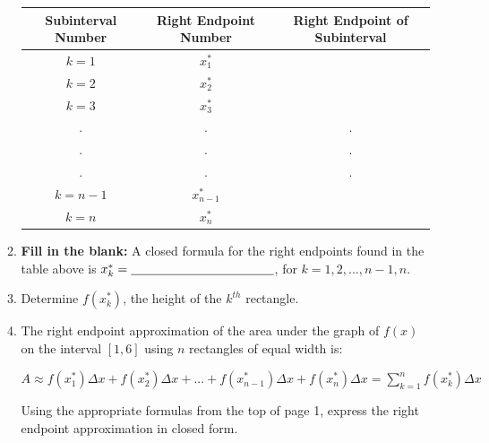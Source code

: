 \documentclass[12pt]{article}
\newif\ifans
\begin{document}
\begin{enumerate}
\begin{enumerate}
\begin{center}
\begin{tabular}{c|c|c}
Subinterval Number & Right Endpoint Number & Right Endpoint of Subinterval\\
\hline
$k=1$ & $x_1^*$ & \ifans{\fbox{$1+\frac{5}{n}$}} \fi\\
\hline
$k=2$ & $x_2^*$ & \ifans{\fbox{$1+\frac{5}{n}(2)$}} \fi\\
\hline
$k=3$ & $x_3^*$ & \ifans{\fbox{$1+\frac{5}{n}(3)$}} \fi \\
\hline
. & . & .\\
. & . & .\\ 
. & . & .\\
\hline
$k=n-1$ & $x_{n-1}^*$ & \ifans{\fbox{$1+\frac{5}{n}(n-1)$}} \fi\\
\hline
$k=n$ & $x_{n}^*$ & \ifans{\fbox{$1+\frac{5}{n}(n)=6$}} \fi\\
\end{tabular}
\end{center}

\item {\bf Fill in the blank:} A closed formula for the right endpoints found in the table above is $x_k^*=\underline{\hspace{2 cm} \ifans{\fbox{$1+\frac{5}{n}(k)$}} \fi \hspace{2cm}}$, for $k=1,2,...,n-1,n$.

\newpage

\item Determine $f(x_k^*)$, the height of the $k^{th}$ rectangle.

\ifans{\fbox{$\left(1+\frac{5}{n}k\right)^2+1$}} \fi

\item The right endpoint approximation of the area under the graph of $f(x)$ on the interval $[1,6]$ using $n$ rectangles of equal width is:\\

\begin{center}
$A \approx f(x_1^*)\Delta x+f(x_2^*)\Delta x+...+f(x_{n-1}^*)\Delta x+f(x_n^*)\Delta x=\sum_{k=1}^n{f(x_k^*)\Delta x}$
\end{center}

Using the appropriate formulas from the top of page 1, express the right endpoint approximation in closed form.

\ifans{\fbox{$\sum_{k=1}^n{f(x_k^*)\Delta x}=\sum_{k=1}^n\left[\left(1+\frac{5}{n}k\right)^2+1\right]\frac{5}{n}=10+\frac{25(n+1)}{n}+\frac{125(n+1)(2n+1)}{6n^2}$}} \fi


\end{enumerate}
\end{enumerate}
\end{document}
